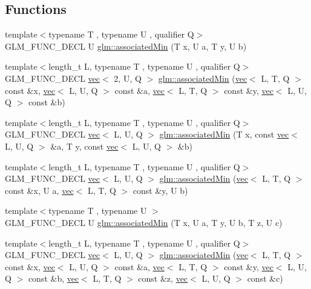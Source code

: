 \subsection*{Functions}
\begin{DoxyCompactItemize}
\item 
{\footnotesize template$<$typename T , typename U , qualifier Q$>$ }\\G\+L\+M\+\_\+\+F\+U\+N\+C\+\_\+\+D\+E\+CL U \hyperlink{group__gtx__associated__min__max_gacc01bd272359572fc28437ae214a02df}{glm\+::associated\+Min} (T x, U a, T y, U b)
\item 
{\footnotesize template$<$length\+\_\+t L, typename T , typename U , qualifier Q$>$ }\\G\+L\+M\+\_\+\+F\+U\+N\+C\+\_\+\+D\+E\+CL \hyperlink{structglm_1_1vec}{vec}$<$ 2, U, Q $>$ \hyperlink{group__gtx__associated__min__max_gac2f0dff90948f2e44386a5eafd941d1c}{glm\+::associated\+Min} (\hyperlink{structglm_1_1vec}{vec}$<$ L, T, Q $>$ const \&x, \hyperlink{structglm_1_1vec}{vec}$<$ L, U, Q $>$ const \&a, \hyperlink{structglm_1_1vec}{vec}$<$ L, T, Q $>$ const \&y, \hyperlink{structglm_1_1vec}{vec}$<$ L, U, Q $>$ const \&b)
\item 
{\footnotesize template$<$length\+\_\+t L, typename T , typename U , qualifier Q$>$ }\\G\+L\+M\+\_\+\+F\+U\+N\+C\+\_\+\+D\+E\+CL \hyperlink{structglm_1_1vec}{vec}$<$ L, U, Q $>$ \hyperlink{group__gtx__associated__min__max_gacfec519c820331d023ef53a511749319}{glm\+::associated\+Min} (T x, const \hyperlink{structglm_1_1vec}{vec}$<$ L, U, Q $>$ \&a, T y, const \hyperlink{structglm_1_1vec}{vec}$<$ L, U, Q $>$ \&b)
\item 
{\footnotesize template$<$length\+\_\+t L, typename T , typename U , qualifier Q$>$ }\\G\+L\+M\+\_\+\+F\+U\+N\+C\+\_\+\+D\+E\+CL \hyperlink{structglm_1_1vec}{vec}$<$ L, U, Q $>$ \hyperlink{group__gtx__associated__min__max_ga4757c7cab2d809124a8525d0a9deeb37}{glm\+::associated\+Min} (\hyperlink{structglm_1_1vec}{vec}$<$ L, T, Q $>$ const \&x, U a, \hyperlink{structglm_1_1vec}{vec}$<$ L, T, Q $>$ const \&y, U b)
\item 
{\footnotesize template$<$typename T , typename U $>$ }\\G\+L\+M\+\_\+\+F\+U\+N\+C\+\_\+\+D\+E\+CL U \hyperlink{group__gtx__associated__min__max_gad0aa8f86259a26d839d34a3577a923fc}{glm\+::associated\+Min} (T x, U a, T y, U b, T z, U c)
\item 
{\footnotesize template$<$length\+\_\+t L, typename T , typename U , qualifier Q$>$ }\\G\+L\+M\+\_\+\+F\+U\+N\+C\+\_\+\+D\+E\+CL \hyperlink{structglm_1_1vec}{vec}$<$ L, U, Q $>$ \hyperlink{group__gtx__associated__min__max_ga723e5411cebc7ffbd5c81ffeec61127d}{glm\+::associated\+Min} (\hyperlink{structglm_1_1vec}{vec}$<$ L, T, Q $>$ const \&x, \hyperlink{structglm_1_1vec}{vec}$<$ L, U, Q $>$ const \&a, \hyperlink{structglm_1_1vec}{vec}$<$ L, T, Q $>$ const \&y, \hyperlink{structglm_1_1vec}{vec}$<$ L, U, Q $>$ const \&b, \hyperlink{structglm_1_1vec}{vec}$<$ L, T, Q $>$ const \&z, \hyperlink{structglm_1_1vec}{vec}$<$ L, U, Q $>$ const \&c)

\end{DoxyCompactItemize}
